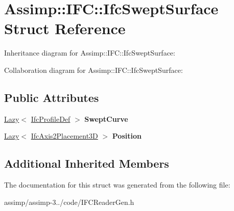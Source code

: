 \hypertarget{struct_assimp_1_1_i_f_c_1_1_ifc_swept_surface}{\section{Assimp\+:\+:I\+F\+C\+:\+:Ifc\+Swept\+Surface Struct Reference}
\label{struct_assimp_1_1_i_f_c_1_1_ifc_swept_surface}
}


Inheritance diagram for Assimp\+:\+:I\+F\+C\+:\+:Ifc\+Swept\+Surface\+:


Collaboration diagram for Assimp\+:\+:I\+F\+C\+:\+:Ifc\+Swept\+Surface\+:
\subsection*{Public Attributes}
\begin{DoxyCompactItemize}
\item 
\hypertarget{struct_assimp_1_1_i_f_c_1_1_ifc_swept_surface_ad61e85aebf650ea2d6da8870f1579759}{\hyperlink{struct_assimp_1_1_s_t_e_p_1_1_lazy}{Lazy}$<$ \hyperlink{struct_assimp_1_1_i_f_c_1_1_ifc_profile_def}{Ifc\+Profile\+Def} $>$ {\bfseries Swept\+Curve}}\label{struct_assimp_1_1_i_f_c_1_1_ifc_swept_surface_ad61e85aebf650ea2d6da8870f1579759}

\item 
\hypertarget{struct_assimp_1_1_i_f_c_1_1_ifc_swept_surface_a992ce3bc8562e99affd2cc173ba02443}{\hyperlink{struct_assimp_1_1_s_t_e_p_1_1_lazy}{Lazy}$<$ \hyperlink{struct_assimp_1_1_i_f_c_1_1_ifc_axis2_placement3_d}{Ifc\+Axis2\+Placement3\+D} $>$ {\bfseries Position}}\label{struct_assimp_1_1_i_f_c_1_1_ifc_swept_surface_a992ce3bc8562e99affd2cc173ba02443}

\end{DoxyCompactItemize}
\subsection*{Additional Inherited Members}


The documentation for this struct was generated from the following file\+:\begin{DoxyCompactItemize}
\item 
assimp/assimp-\/3../code/I\+F\+C\+Reader\+Gen.\+h\end{DoxyCompactItemize}
